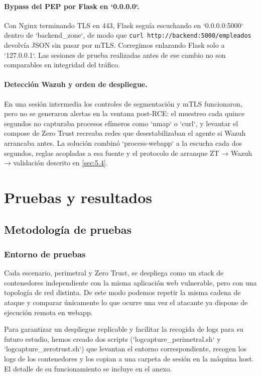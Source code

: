 \documentclass[11pt,spanish,listoffigures,listoftables]{tfgetsinf}
\begin{document}
    \subsubsection{Bypass del PEP por Flask en `0.0.0.0`.} 
    Con Nginx terminando TLS en 443, Flask seguía escuchando en `0.0.0.0:5000` dentro de `backend\_zone`, de modo que \texttt{curl http://backend:5000/empleados} devolvía JSON sin pasar por mTLS. Corregimos enlazando Flask solo a `127.0.0.1`. Las sesiones de prueba realizadas antes de ese cambio no son comparables en integridad del tráfico.
    
    \subsubsection{Detección Wazuh y orden de despliegue.}
    En una sesión intermedia los controles de segmentación y mTLS funcionaron, pero no se generaron alertas en la ventana post-RCE: el muestreo cada quince segundos no capturaba procesos efímeros como `nmap` o `curl`, y levantar el compose de Zero Trust recreaba redes que desestabilizaban el agente si Wazuh arrancaba antes. La solución combinó `process-webapp` a la escucha cada dos segundos, reglas acopladas a esa fuente y el protocolo de arranque ZT → Wazuh → validación descrito en \cref{sec:5.4}.


\chapter{Pruebas y resultados}
\label{sec:6}

    \section{Metodología de pruebas}
    \label{sec:6.1}
        \subsection{Entorno de pruebas}

        Cada escenario, perimetral y Zero Trust, se despliega como un stack de contenedores independiente con la misma aplicación web vulnerable, pero con una topología de red distinta. De este modo podemos repetir la misma cadena de ataque y comparar únicamente lo que ocurre una vez el atacante ya dispone de ejecución remota en webapp.
        
        Para garantizar un despliegue replicable y facilitar la recogida de logs para su futuro estudio, hemos creado dos scripts (`logcapture\_perimetral.sh` y `logcapture\_zerotrust.sh`) que levantan el entorno correspondiente, recogen los logs de los contenedores y los copian a una carpeta de sesión en la máquina host. El detalle de su funcionamiento se incluye en el anexo.
        
\end{document}
